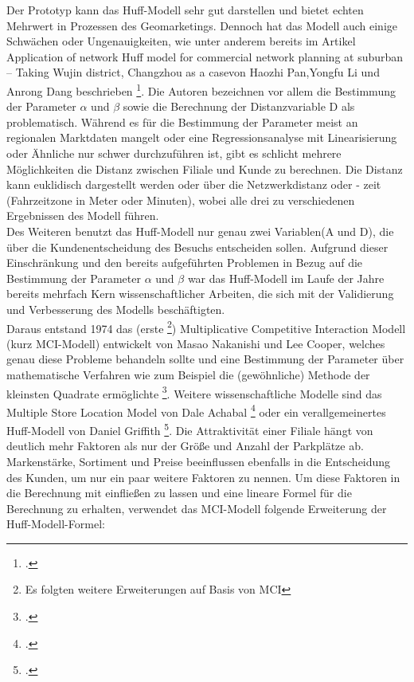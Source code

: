 Der Prototyp kann das Huff-Modell sehr gut darstellen und bietet echten Mehrwert in Prozessen des Geomarketings.
Dennoch hat das Modell auch einige Schwächen oder Ungenauigkeiten, wie unter anderem bereits im Artikel \glqq Application of network Huff model for commercial network planning at suburban – Taking Wujin district, Changzhou as a case\glqq von Haozhi Pan,Yongfu Li und Anrong Dang beschrieben \footcite{pan_application_2013}.
Die Autoren bezeichnen vor allem die Bestimmung der Parameter $\alpha$ und $\beta$ sowie die Berechnung der Distanzvariable D als problematisch.
Während es für die Bestimmung der Parameter meist an regionalen Marktdaten mangelt oder eine Regressionsanalyse mit Linearisierung oder Ähnliche  nur schwer durchzuführen ist, gibt es schlicht mehrere Möglichkeiten die Distanz zwischen Filiale und Kunde zu berechnen.
Die Distanz kann euklidisch dargestellt werden oder über die Netzwerkdistanz oder - zeit (Fahrzeitzone in Meter oder Minuten), wobei alle drei zu verschiedenen Ergebnissen des Modell führen.\\
Des Weiteren benutzt das Huff-Modell nur genau zwei Variablen(A und D), die über die Kundenentscheidung des Besuchs entscheiden sollen.
Aufgrund dieser Einschränkung und den bereits aufgeführten Problemen in Bezug auf die Bestimmung der Parameter $\alpha$ und $\beta$ war das Huff-Modell im Laufe der Jahre bereits mehrfach Kern wissenschaftlicher Arbeiten, die sich mit der Validierung und Verbesserung des Modells beschäftigten.\\
Daraus entstand 1974 das (erste \footnote{Es folgten weitere Erweiterungen auf Basis von MCI}) Multiplicative Competitive Interaction Modell (kurz MCI-Modell) entwickelt von Masao Nakanishi und Lee Cooper, welches genau diese Probleme behandeln sollte und eine Bestimmung der Parameter über mathematische Verfahren wie zum Beispiel die (gewöhnliche) Methode der kleinsten Quadrate ermöglichte \footcite{nakanishi_parameter_1974}. 
Weitere wissenschaftliche Modelle sind das Multiple Store Location Model von Dale Achabal \footcite{achabal_slop_1984} oder ein verallgemeinertes Huff-Modell von Daniel Griffith \footcite{griffith_generalized_1982}.
Die Attraktivität einer Filiale hängt von deutlich mehr Faktoren als nur der Größe und Anzahl der Parkplätze ab.
Markenstärke, Sortiment und Preise beeinflussen ebenfalls in die Entscheidung des Kunden, um nur ein paar weitere Faktoren zu nennen.
Um diese Faktoren in die Berechnung mit einfließen zu lassen und eine lineare Formel für die Berechnung zu erhalten, verwendet das MCI-Modell folgende Erweiterung der Huff-Modell-Formel:

